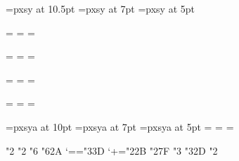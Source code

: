 \font\tenpxsy=pxsy at 10.5pt
\font\sevenpxsy=pxsy at 7pt
\font\fivepxsy=pxsy at 5pt

=\tenrm
{}=\sevenrm
{}=\fiverm

=\teneurm
{}=\seveneurm
{}=\fiveeurm

=\tenpxsy
{}=\sevenpxsy
{}=\fivepxsy

=\tenpxex
{}=\sevenpxex
{}=\fivepxex

\font\tenpxsya=pxsya at 10pt
\font\sevenpxsya=pxsya at 7pt
\font\fivepxsya=pxsya at 5pt
\newfam\syafam
\textfont\syafam=\tenpxsya
\scriptfont\syafam=\sevenpxsya
\scriptscriptfont\syafam=\fivepxsya

\mathchardef\triangleright"2\hexdigit{}
\mathchardef\triangleleft"2\hexdigit{}
\mathchardef\therefore"6\hexdigit{}
\mathchardef\because"6\hexdigit\syafam 2A
\mathcode`=="3\hexdigit\scfam 3D
\mathcode`+="2\hexdigit\scfam 2B
\mathchardef\suchthat"2\hexdigit\bbbfam 7F
\mathchardef\subsetneq"3\hexdigit{}
\mathchardef\precwk"3\hexdigit\syafam 2D
\mathchardef\leadsto"2\hexdigit{}
\def\vec#1{\mathaccent"247E {\kern.35ex\relax#1}}
\def\ddot#1{\mathaccent"0000A8{\kern-.05em\relax#1}}


\def\Longrightarrow{\Relbar\joinrel\Rightarrow}
